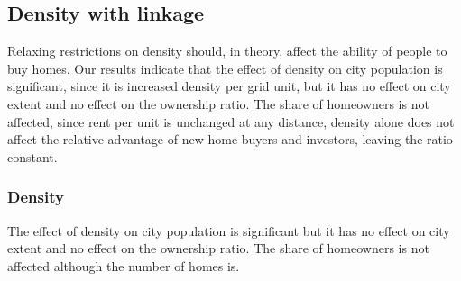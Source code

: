 \subsection{Density with linkage}
Relaxing restrictions on density should, in theory, affect the ability of people to buy homes. Our results indicate that the effect of density on city population is significant, since it is increased density per grid unit, but it has no effect on city extent and no effect on the ownership ratio. %
The share of homeowners is not affected, since rent per unit is unchanged at any distance, density alone does not affect the relative advantage of new home buyers and investors, leaving the ratio constant. %


\subsubsection{Density}

The effect of density on city population is significant but it has no effect on city extent and no effect on the ownership ratio. The share of homeowners is not affected although the number of homes is. 

